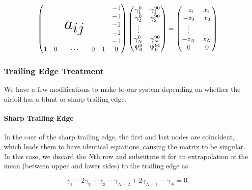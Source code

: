 \documentclass[]{article}
\begin{document}
 \begin{equation}
	\begin{pmatrix}
		& & & & & -1 \\
		& & \multirow{3}{*}{\Huge $a_{ij}$}  & & & -1 \\
		& & & & & -1 \\
		& & & & & -1 \\
		& & & & & -1 \\
		1 & 0 & \cdots & 0 & 1 & 0
	\end{pmatrix}
%
	\begin{pmatrix}
		\gamma^0_1 & \gamma^{90}_1 \\
		\gamma^0_2 & \gamma^{90}_2 \\
		\vdots \\
		\gamma^0_N & \gamma^{90}_N \\
		\Psi^0_0 & \Psi^{90}_0\\
	\end{pmatrix}
=
	\begin{pmatrix}
		-z_1 & x_1 \\
		-z_2 & x_2 \\
		\vdots \\
		-z_N & x_N \\
		0 & 0
	\end{pmatrix}
\end{equation}


\subsubsection{Trailing Edge Treatment}
\label{sssec:trailingedge}

We have a few modifications to make to our system depending on whether the airfoil has a blunt or sharp trailing edge.

\paragraph{Sharp Trailing Edge}

In the case of the sharp trailing edge, the first and last nodes are coincident, which leads them to have identical equations, causing the matrix to be singular.  In this case, we discard the \(N\)th row and substitute it for an extrapolation of the mean (between upper and lower sides) to the trailing edge as

\begin{equation}
	\gamma_1 - 2\gamma_2 + \gamma_3 - \gamma_{N-2} + 2\gamma_{N-1} - \gamma_N = 0.
\end{equation}
\end{document}
